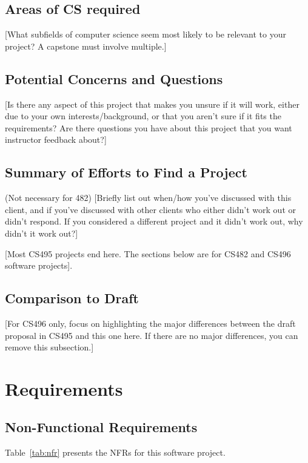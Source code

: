 \documentclass{article}
\begin{document}
\subsection{Areas of CS required}
[What subfields of computer science seem most likely to be relevant to your project? A capstone must involve multiple.]

\subsection{Potential Concerns and Questions}
[Is there any aspect of this project that makes you unsure if it will work, either due to your own interests/background, or that you aren't sure if it fits the requirements? Are there questions you have about this project that you want instructor feedback about?]

\subsection{Summary of Efforts to Find a Project}
(Not necessary for 482) [Briefly list out when/how you've discussed with this client, and if you've discussed with other clients who either didn't work out or didn't respond. If you considered a different project and it didn't work out, why didn't it work out?] 

[Most CS495 projects end here. The sections below are for CS482 and CS496 software projects].

\subsection{Comparison to Draft}
[For CS496 only, focus on highlighting the major differences between the draft proposal in CS495 and this one here. If there are no major differences, you can remove this subsection.]

\section{Requirements}

\subsection{Non-Functional Requirements}
Table~\ref{tab:nfr} presents the NFRs for this software project.
\end{document}
